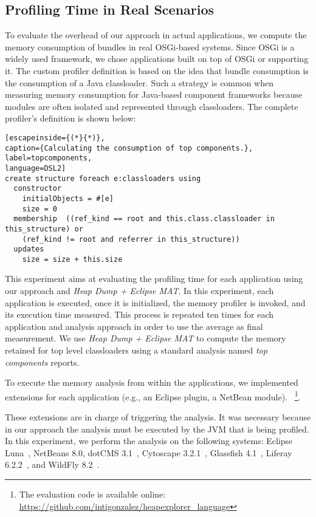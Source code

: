 \subsection{Profiling Time in Real Scenarios}
To evaluate the overhead of our approach in actual applications, 
we compute the memory consumption of bundles in real OSGi-based systems.
Since OSGi is a widely used framework, we chose applications built on top of OSGi or supporting it.
The custom profiler definition is based on the idea that bundle consumption is the consumption of a Java classloader.
Such a strategy is common when measuring memory consumption for Java-based component frameworks because modules are often isolated and represented through classloaders.
The complete profiler's definition is shown below:
\begin{lstlisting}[escapeinside={(*}{*)},
caption={Calculating the consumption of top components.},
label=topcomponents,
language=DSL2]
create structure foreach e:classloaders using
  constructor
    initialObjects = #[e]
    size = 0
  membership  ((ref_kind == root and this.class.classloader in this_structure) or
	(ref_kind != root and referrer in this_structure))
  updates
    size = size + this.size
\end{lstlisting}

This experiment aims at evaluating the profiling time for each application using our approach and \textit{Heap Dump + Eclipse MAT}.
In this experiment, each application is executed, once it is initialized, the memory profiler is invoked, and its execution time measured.
This process is repeated ten times for each application and analysis approach in order to use the average as final measurement.
We use \textit{Heap Dump + Eclipse MAT}  to compute the memory retained for top level classloaders using  a standard analysis named \textit{top components} reports. 

To execute the memory analysis from within the applications, we implemented extensions for each application (e.g., an Eclipse plugin, a NetBean module). ~\footnote{ The evaluation code is available online: \url{https://github.com/intigonzalez/heapexplorer\_language}}.

These extensions are in charge of triggering the analysis.
It was necessary because in our approach the analysis must be executed by the JVM that is being profiled.
In this experiment, we perform the analysis on the following systems: Eclipse Luna~\cite{luna}, NetBeans 8.0\cite{netbeans}, dotCMS 3.1~\cite{dotcms}, Cytoscape 3.2.1~\cite{cytoscape}, Glassfish 4.1~\cite{glassfish},  Liferay 6.2.2~\cite{liferay}, and WildFly 8.2~\cite{wildfly}.

